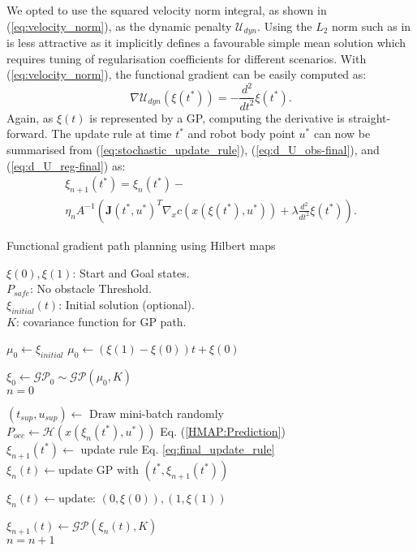 \documentclass[letterpaper, 10 pt, conference]{ieeeconf}  %
\newlength\mylen
\newcommand\myinput[1]{%
	\settowidth\mylen{\KwIn{}}%
	\setlength\hangindent{\mylen}%
	\hspace*{\mylen}#1\\}
\begin{document}
We opted to use the squared velocity norm integral, as shown in (\ref{eq:velocity_norm}), as the dynamic penalty $\mathcal{U}_{dyn}$. Using the $L_2$ norm such as in \cite{Marinho2016} is less attractive as it implicitly defines a favourable simple mean solution which requires tuning of regularisation coefficients for different scenarios. With (\ref{eq:velocity_norm}), the functional gradient can be easily computed as:
\begin{equation}\label{eq:d_U_reg-final}
	\nabla\mathcal{U}_{dyn}(\xi(t^*))= -\frac{d^2}{dt^2}\xi(t^*).
\end{equation}
Again, as $\xi(t)$ is represented by a GP, computing the derivative is straight-forward.  
The update rule at time $t^*$ and robot body point $u^*$ can now be summarised from (\ref{eq:stochastic_update_rule}), (\ref{eq:d_U_obs-final}), and (\ref{eq:d_U_reg-final}) as:
\begin{multline}\label{eq:final_update_rule}
\xi_{n+1}(t^*)= {\xi}_n(t^*) - \\
\eta_n A^{-1}\left(\boldsymbol{J}(t^*,u^*)^T\nabla_x c\left(x\left({\xi}(t^*),u^*\right)\right) + \lambda\frac{d^2}{dt^2}{\xi}(t^*)    \right).
\end{multline}

\begin{algorithm}[bt]
	\caption{Functional gradient path planning using Hilbert maps}
	\label{algo:main}
	\DontPrintSemicolon
	\myinput{$\xi(0),\xi(1)$: Start and Goal states.}
	\myinput{$P_{safe}$: No obstacle Threshold.}
	\myinput{$\xi_{initial}(t)$: Initial solution (optional).}
	\myinput{${K}$: covariance function for GP path.}
	
	{$\mu_0\leftarrow \xi_{initial}$}
	{$\mu_0\leftarrow \left(\xi(1)-\xi(0)\right)t + \xi(0)$}
	
	$\xi_0 \leftarrow \mathcal{GP}_0\sim \mathcal{GP}(\mu_0,{K})$\\
	$n=0$\\
	{
		$(t_{sup},u_{sup}) \leftarrow$ Draw mini-batch randomly\\
		{$P_{occ} \leftarrow \mathcal{H}(x(\xi_n(t^*),u^*))$ Eq. (\ref{HMAP:Prediction})\\
			{$\xi_{n+1}(t^*) \leftarrow$ update rule Eq. \ref{eq:final_update_rule}\\
				
				$\xi_{n}(t) \leftarrow \text{update GP with }(t^*, \xi_{n+1}(t^*))$	
			}
		}
		
		$\xi_n(t) \leftarrow \text{update: } (0, \xi(0)),(1, \xi(1))$
	
		$\xi_{n+1}(t) \leftarrow \mathcal{GP}(\xi_n(t), {K})$ \\
		
		$n=n+1$	
	}
	
\end{algorithm} 
\end{document}
